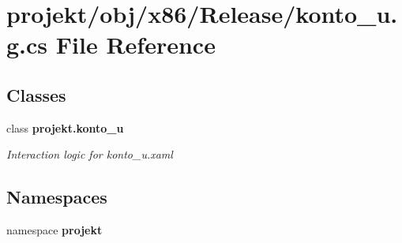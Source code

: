 \section{projekt/obj/x86/\+Release/konto\+\_\+u.g.\+cs File Reference}
\label{x86_2Release_2konto__u_8g_8cs}
\subsection*{Classes}
\begin{DoxyCompactItemize}
\item 
class \textbf{ projekt.\+konto\+\_\+u}
\begin{DoxyCompactList}\small\item\em Interaction logic for konto\+\_\+u.\+xaml \end{DoxyCompactList}\end{DoxyCompactItemize}
\subsection*{Namespaces}
\begin{DoxyCompactItemize}
\item 
namespace \textbf{ projekt}
\end{DoxyCompactItemize}
